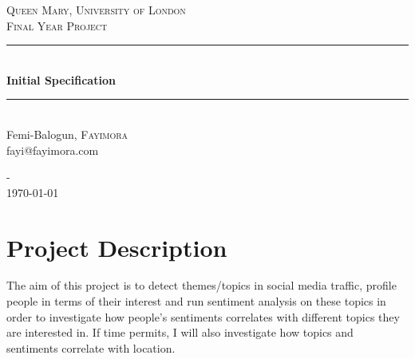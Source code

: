 \documentclass[12pt, a4paper]{article}
\begin{document}
\begin{titlepage}

\newcommand{\HRule}{\rule{\linewidth}{1mm}}
\center%


\textsc{\LARGE Queen Mary, University of London}\\[1.5cm]
\textsc{\large Final Year Project}\\[0.5cm]


\HRule\\[0.4cm]
{\huge \bfseries Initial Specification}\\[0.4cm]
\HRule\\[1.5cm]

Femi-Balogun, \textsc{Fayimora}\\[0.2cm]
fayi@fayimora.com

\vfill

-\\
{\large \today}\\[3cm]

\end{titlepage}

\tableofcontents
\newpage


\section{Project Description}
The aim of this project is to detect themes/topics in social media traffic, profile people in terms
of their interest and run sentiment analysis on these topics in order to investigate how people's
sentiments correlates with different topics they are interested in. If time permits, I will also
investigate how topics and sentiments correlate with location.
\end{document}
